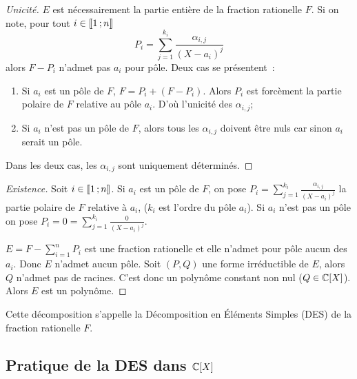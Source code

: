 \begin{proof}[Unicité]
  \(E\) est nécessairement la partie entière de la fraction rationelle \(F\). Si on note, pour tout \(i \in \mathopen{\llbracket}1\mathclose{}\mathpunct{};n\mathclose{\rrbracket}\)
  \begin{equation}
    P_i = \sum_{j=1}^{k_i} \frac{\alpha_{i,j}}{(X-a_i)^{j}}
  \end{equation}
  alors \(F-P_i\) n'admet pas \(a_i\) pour pôle. Deux cas se présentent~:
  \begin{enumerate}
  \item Si \(a_i\) est un pôle de \(F\), \(F=P_i+(F-P_i)\). Alors \(P_i\) est forcèment la partie polaire de \(F\) relative au pôle \(a_i\). D'où l'unicité des \(\alpha_{i,j}\);
  \item Si \(a_i\) n'est pas un pôle de \(F\), alors tous les \(\alpha_{i,j}\) doivent être nuls car sinon \(a_i\) serait un pôle.
  \end{enumerate}
  Dans les deux cas, les \(\alpha_{i,j}\) sont uniquement déterminés.
\end{proof}
\begin{proof}[Existence]
  Soit \(i \in \mathopen{\llbracket}1\mathclose{}\mathpunct{};n\mathclose{\rrbracket}\). Si \(a_i\) est un pôle de \(F\), on pose \(P_i = \sum_{j=1}^{k_i} \frac{\alpha_{i,j}}{(X-a_i)^{j}}\) la partie polaire de \(F\) relative à \(a_i\), (\(k_i\) est l'ordre du pôle \(a_i\)). Si \(a_i\) n'est pas un pôle on pose \(P_i=0=\sum_{j=1}^{k_i} \frac{0}{(X-a_i)^{j}}\).

  \(E=F-\sum_{i=1}^n P_i\) est une fraction rationelle et elle n'admet pour pôle aucun des \(a_i\). Donc \(E\) n'admet aucun pôle. Soit \((P,Q)\) une forme irréductible de \(E\), alors \(Q\) n'admet pas de racines. C'est donc un polynôme constant non nul (\(Q \in \mathbb{C}[X]\)). Alors \(E\) est un polynôme.
\end{proof}

Cette décomposition s'appelle la Décomposition en Éléments Simples (DES) de la fraction rationelle \(F\).

\subsection{Pratique de la DES dans \(\mathbb{C}[X]\)}

